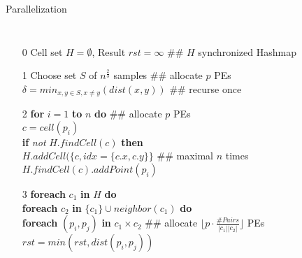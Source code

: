\documentclass[18pt]{beamer}
\begin{document}
\setlength{\columnsep}{-10cm}
\begin{frame}{Parallelization}
\begin{columns}

\small
\begin{itemize}\itemsep0pt
\item[\footnotesize 0] Cell set $H = \emptyset$, Result $rst = \infty$ \alert{\#\# $H$ synchronized Hashmap} \\
						
\vspace{8pt}
\item[\footnotesize 1] 
Choose set $S$ of $n^{\frac{2}{3}}$ samples \alert{\#\# allocate $p$ PEs}\\
						$\delta = min_{x,y \in S, x \neq y}(dist(x, y))$ \alert{\#\# recurse once}\\
\item[\footnotesize 2] \textbf{for} $i = 1$ \textbf{to} $n$ \textbf{do} \alert{\#\# allocate $p$ PEs} \\
						\hspace{2em}$c = cell(p_i)$ \\
						\hspace{2em}\textbf{if} \textit{not} $H.findCell(c)$ \textbf{then} \\
						\hspace{4em}$H.addCell(\{c, idx = \{c.x, c.y\}\}$ \alert{\#\# maximal $n$ times}\\								\hspace{2em}$H.findCell(c).addPoint(p_i)$ \\
\item[\footnotesize 3] %
						\textbf{foreach} $c_1$ \textbf{in} $H$ \textbf{do} \\
						\hspace{2em} \textbf{foreach} $c_2$ \textbf{in} $\{c_1\} \cup neighbor(c_1)$ \textbf{do} \\
						\hspace{4em} \textbf{foreach} $(p_i,p_j)$ \textbf{in} $c_1 \times c_2$ \alert{\#\# allocate $\lfloor p \cdot \frac{\#Pairs}{|c_1||c_2|}\rfloor$ PEs}\\
						\hspace{6em} $rst = min(rst, dist(p_i, p_j))$
\end{itemize}


\end{columns}
\end{frame}
\end{document}
